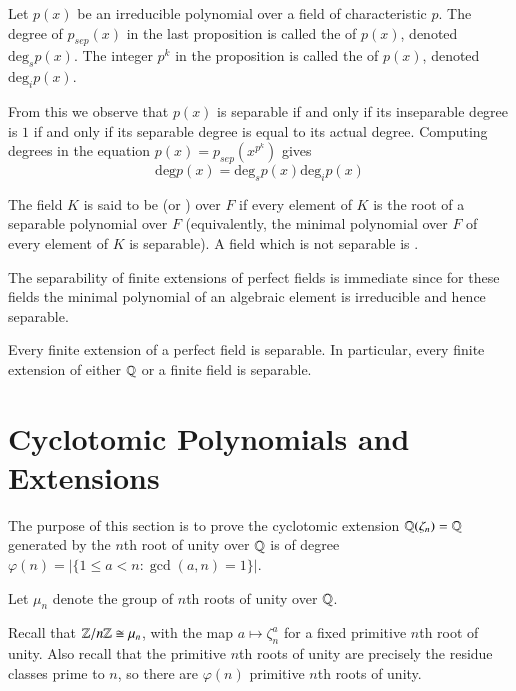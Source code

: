 \documentclass[12pt, a4paper, oneside, openright, titlepage]{book}
\begin{document}
\begin{defn}
    Let $p(x)$ be an irreducible polynomial over a field of characteristic $p$. The degree of $p_{sep}(x)$ in the last proposition is called the  of $p(x)$, denoted $\text{deg}_sp(x)$. The integer $p^k$ in the proposition is called the  of $p(x)$, denoted $\text{deg}_ip(x)$.
\end{defn}

From this we observe that $p(x)$ is separable if and only if its inseparable degree is $1$ if and only if its separable degree is equal to its actual degree. Computing degrees in the equation $p(x) = p_{sep}(x^{p^k})$ gives \begin{equation*}
    \text{deg}p(x) = \text{deg}_sp(x)\text{deg}_ip(x)
\end{equation*}


\begin{defn}
    The field $K$ is said to be  (or ) over $F$ if every element of $K$ is the root of a separable polynomial over $F$ (equivalently, the minimal polynomial over $F$ of every element of $K$ is separable). A field which is not separable is .
\end{defn}

The separability of finite extensions of perfect fields is immediate since for these fields the minimal polynomial of an algebraic element is irreducible and hence separable.

\begin{cor}
    Every finite extension of a perfect field is separable. In particular, every finite extension of either $\mathbb Q$ or a finite field is separable.
\end{cor}



\section{Cyclotomic Polynomials and Extensions}


The purpose of this section is to prove the cyclotomic extension $\mathbb Q(\zeta_n) =\mathbb Q$ generated by the $n$th root of unity over $\mathbb Q$ is of degree $\varphi(n) = |\{1\leq a < n: \gcd(a,n) = 1\}|$. 

\begin{defn}
    Let $\mu_n$ denote the group of $n$th roots of unity over $\mathbb Q$.
\end{defn}


Recall that $\mathbb Z/n\mathbb Z \cong \mu_n$, with the map $a \mapsto \zeta_n^a$ for a fixed primitive $n$th root of unity. Also recall that the primitive $n$th roots of unity are precisely the residue classes prime to $n$, so there are $\varphi(n)$ primitive $n$th roots of unity.
\end{document}
